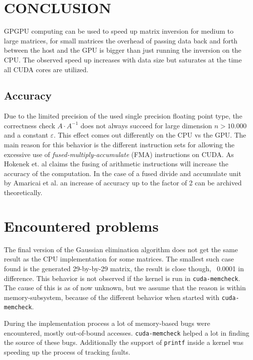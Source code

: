 
\section{CONCLUSION}
\label{sec:conclusion}

GPGPU computing can be used to speed up matrix inversion for medium to large matrices, for small matrices the overhead of passing data back and forth between the host and the GPU is bigger than just running the inversion on the CPU. The observed speed up increases with data size but saturates at the time all CUDA cores are utilized. 

\subsection*{Accuracy}
Due to the limited precision of the used single precision floating point type, the correctness check $A \cdot A^{-1}$ does not always succeed for large dimension $n > 10.000$ and a constant $\varepsilon$. This effect comes out differently on the CPU vs the GPU. The main reason for this behavior is the different instruction sets for allowing the excessive use of \emph{fused-multiply-accumulate} (FMA) instructions on CUDA. As Hokenek et. al \cite{Hokenek90} claims the fusing of arithmetic instructions will increase the accuracy of the computation. In the case of a fused divide and accumulate unit by Amaricai et al. \cite{Amaricai2010} an increase of accuracy up to the factor of 2 can be archived theoretically.

\section{Encountered problems}
The final version of the Gaussian elimination algorithm does not get the same result as the CPU implementation for some matrices. The smallest such case found is the generated 29-by-by-29 matrix, the result is close though, ~0.0001 in difference. This behavior is not observed if the kernel is run in \texttt{cuda-memcheck}. The cause of this is as of now unknown, but we assume that the reason is within memory-subsystem, because of the different behavior when started with \texttt{cuda-memcheck}.

During the implementation process a lot of memory-based bugs were encountered, mostly out-of-bound accesses. \texttt{cuda-memcheck} helped a lot in finding the source of these bugs. Additionally the support of \texttt{printf} inside a kernel was speeding up the process of tracking faults.
